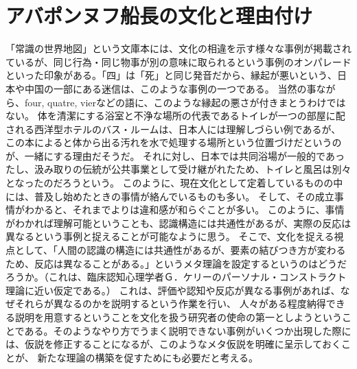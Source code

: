 \section{アバポンヌフ船長の文化と理由付け}
「常識の世界地図」という文庫本には、文化の相違を示す様々な事例が掲載されているが、同じ行為・同じ物事が別の意味に取られるという事例のオンパレードといった印象がある。「四」は「死」と同じ発音だから、縁起が悪いという、日本や中国の一部にある迷信は、このような事例の一つである。
当然の事ながら、four, quatre, vierなどの語に、このような縁起の悪さが付きまとうわけではない。
体を清潔にする浴室と不浄な場所の代表であるトイレが一つの部屋に配される西洋型ホテルのバス・ルームは、日本人には理解しづらい例であるが、
この本によると体から出る汚れを水で処理する場所という位置づけだというのが、一緒にする理由だそうだ。
それに対し、日本では共同浴場が一般的であったし、汲み取りの伝統が公共事業として受け継がれたため、トイレと風呂は別々となったのだろうという。
このように、現在文化として定着しているものの中には、普及し始めたときの事情が絡んでいるものも多い。
そして、その成立事情がわかると、それまでよりは違和感が和らぐことが多い。
このように、事情がわかれば理解可能ということも、認識構造には共通性があるが、実際の反応は異なるという事例と捉えることが可能なように思う。
そこで、文化を捉える視点として、「人間の認識の構造には共通性があるが、要素の結びつき方が変わるため、反応は異なることがある。」というメタ理論を設定するというのはどうだろうか。（これは、臨床認知心理学者Ｇ．ケリーのパーソナル・コンストラクト理論に近い仮定である。）
これは、評価や認知や反応が異なる事例があれば、なぜそれらが異なるのかを説明するという作業を行い、
人々がある程度納得できる説明を用意するということを文化を扱う研究者の使命の第一としようということである。そのようなやり方でうまく説明できない事例がいくつか出現した際には、仮説を修正することになるが、このようなメタ仮説を明確に呈示しておくことが、
新たな理論の構築を促すためにも必要だと考える。
